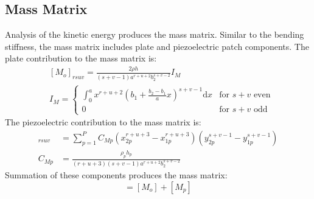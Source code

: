 \documentclass{article}
\begin{document}
\begin{body}
\subsection{Mass Matrix}
Analysis of the kinetic energy produces the mass matrix. Similar to the bending stiffness, the mass matrix includes plate and piezoelectric patch components. The plate contribution to the mass matrix is:
\begin{align}\label{Mass}
&[M_o]_{rsuv} = \frac{2\rho h}{(s+v-1)a^{r+u+2}b_2^{s+v-2}}I_M \\
&I_M = 
\begin{cases}
\int_0^a x^{r+u+2}(b_1+\frac{b_2-b_1}{a}x)^{s+v-1} \text{d}x & \text{for } s+v \text{ even} \\
0 & \text{for } s+v \text{ odd}
\end{cases}
\end{align}
The piezoelectric contribution to the mass matrix is:
\begin{align}
[M_p]_{rsuv}&=\sum_{p=1}^P C_{Mp} (x_{2p}^{r+u+3}-x_{1p}^{r+u+3})(y_{2p}^{s+v-1}-y_{1p}^{s+v-1}) \\
C_{Mp}&=\frac{\rho_p h_p}{(r+u+3)(s+v-1)a^{r+u+2}b_2^{s+v-2}}
\end{align}
Summation of these components produces the mass matrix:
\begin{equation}
[M]=[M_o]+[M_p]
\end{equation}







\end{body}
\end{document}
